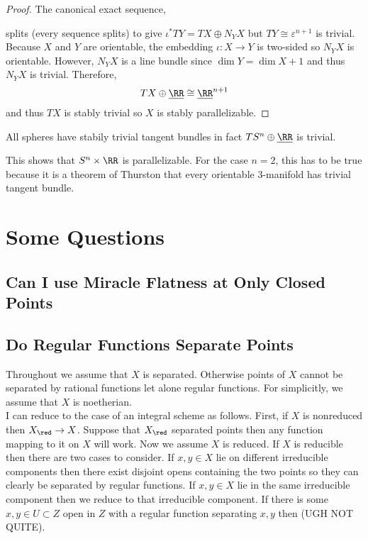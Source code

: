 \documentclass[12pt]{article}
\begin{document}
\begin{proof}
The canonical exact sequence,
\begin{center}
\end{center}
splits (every sequence splits) to give $\iota^* TY = TX \oplus N_Y X$ but $TY \cong \varepsilon^{n+1}$ is trivial. Because $X$ and $Y$ are orientable, the embedding $\iota : X \to Y$ is two-sided so $N_Y  X$ is orientable. However, $N_Y X$ is a line bundle since $\dim{Y} = \dim{X} + 1$ and thus $N_Y X$ is trivial. Therefore,
\[ T X \oplus \underline{\RR} \cong \underline{\RR}^{n+1} \]
and thus $TX$ is stably trivial so $X$ is stably parallelizable. 
\end{proof}

\begin{cor}
All spheres have stabily trivial tangent bundles in fact $T S^n \oplus \underline{\RR}$ is trivial.
\end{cor}

\begin{rmk}
This shows that $S^n \times \RR$ is parallelizable. For the case $n = 2$, this has to be true because it is a theorem of Thurston that every orientable $3$-manifold has trivial tangent bundle.
\end{rmk}

\section{Some Questions}

\subsection{Can I use Miracle Flatness at Only Closed Points}

\subsection{Do Regular Functions Separate Points}

Throughout we assume that $X$ is separated. Otherwise points of $X$ cannot be separated by rational functions let alone regular functions.
For simplicitly, we assume that $X$ is noetherian.
\bigskip\\
I can reduce to the case of an integral scheme as follows. First, if $X$ is nonreduced then $X_{\red} \to X$. Suppose that $X_{\red}$ separated points then any function mapping to it on $X$ will work. Now we assume $X$ is reduced. If $X$ is reducible then there are two cases to consider. If $x,y \in X$ lie on different irreducible components then there exist disjoint opens containing the two points so they can clearly be separated by regular functions. If $x,y \in X$ lie in the same irreducible component then we reduce to that irreducible component. If there is some $x,y \in U \subset Z$ open in $Z$ with a regular function separating $x, y$ then (UGH NOT QUITE).
\end{document}
